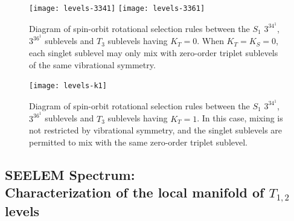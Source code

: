 \documentclass[12pt]{mitthesis}
\begin{document}


\begin{figure}
  \caption{Diagram of spin-orbit rotational selection rules between
    the $S_1$ $3^34^1$, $3^36^1$  sublevels and $T_3$ sublevels
    having $K_T=0$.  When $K_T=K_S=0$, each singlet sublevel may only
    mix with zero-order triplet sublevels of the same vibrational
    symmetry.}
  \label{fig:levels-k0}
  \centering
  \vspace{5mm}
  \texttt{[image: levels-3341]}
  \texttt{[image: levels-3361]}  
\end{figure}

\begin{figure}
  \caption{Diagram of spin-orbit rotational selection rules between
    the $S_1$ $3^34^1$, $3^36^1$  sublevels and $T_3$ sublevels
    having $K_T=1$.  In this case, mixing is not restricted by
    vibrational symmetry, and the singlet sublevels are permitted to
    mix with the same zero-order triplet sublevel.}
  \label{fig:levels-k1}
  \centering
  \vspace{5mm}
  \texttt{[image: levels-k1]}
\end{figure}


























\subsection{SEELEM Spectrum: \\Characterization of the local manifold of
  $T_{1,2}$ levels}
\end{document}
